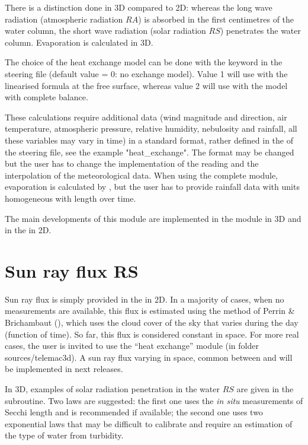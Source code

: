 There is a distinction done in 3D compared to 2D:
whereas the long wave radiation (atmospheric radiation $RA$) is absorbed in
the first centimetres of the water column, the short wave radiation (solar
radiation $RS$) penetrates the water column. Evaporation is calculated in 3D.

The choice of the heat exchange model can be done with the keyword
 in the \waqtel steering file
(default value = 0: no exchange
model). Value 1 will use with the linearised formula at the free surface,
whereas value 2 will use with the model with complete balance.

These calculations require additional data (wind magnitude and direction, air
temperature, atmospheric pressure, relative humidity, nebulosity and rainfall,
all these variables may vary in time) in a standard format, rather defined
in the  of the  steering file,
see the example "heat\_exchange".
The format may be changed but the user has to change the
implementation of the reading and the interpolation of the meteorological data.
When using the complete module, evaporation is calculated by , but
the user has to provide rainfall data with units homogeneous with length over
time.

The main developments of this module are implemented in the module
 in 3D and in the  in 2D.


\section{Sun ray flux RS}

Sun ray flux is simply provided in the  in 2D.
In a majority of cases, when no measurements are available,
this flux is estimated using the method of Perrin \& Brichambaut (\cite{El-Kadi2012}),
which uses the cloud cover of the sky that varies during the day (function of time).
So far, this flux is considered constant in space.
For more real cases, the user is invited to use the ``heat exchange'' module
(in folder sources/telemac3d).
A sun ray flux varying in space, common between  and  will be implemented in next releases.

In 3D, examples of solar radiation penetration in the water $RS$ are given in the
 subroutine. Two laws are suggested: the first one
uses the \emph{in situ} measurements of Secchi length and is
recommended if available; the second one uses two exponential laws that may be
difficult to calibrate and require an estimation of the type of water from
turbidity.

